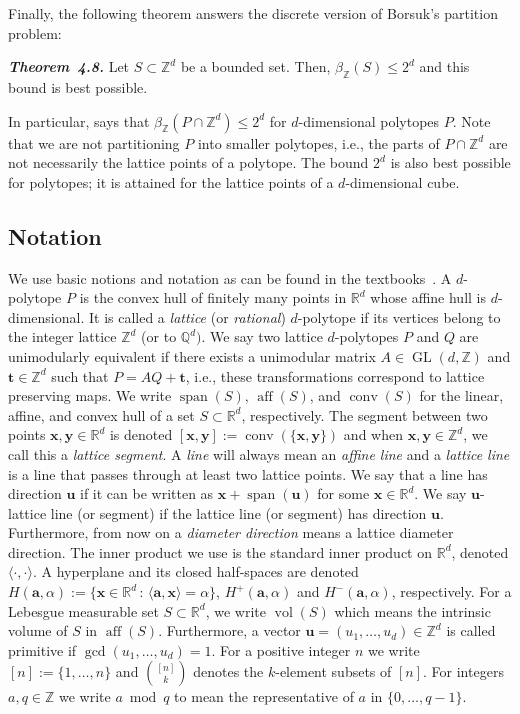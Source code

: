 \documentclass[11pt]{article}
\newcommand{\ba}{\mathbf{a}}
\newcommand{\bt}{\mathbf{t}}
\newcommand{\bu}{\mathbf{u}}
\newcommand{\bv}{\mathbf{v}}
\newcommand{\bx}{\mathbf{x}}
\newcommand{\by}{\mathbf{y}}
\newcommand{\R}{\mathbb{R}}
\newcommand{\Z}{\mathbb{Z}}
\newcommand{\Q}{\mathbb{Q}}
\DeclareMathOperator{\conv}{conv}
\DeclareMathOperator{\aff}{aff}
\DeclareMathOperator{\vol}{vol}
\DeclareMathOperator{\spn}{span}
\DeclareMathOperator{\GL}{GL} %
\newcommand{\st}{\, \mathrm{:}\,}
\begin{document}
Finally, the following theorem answers the discrete version of Borsuk's partition problem:

\begin{manualthm}\textbf{\emph{Theorem~4.8.}}
    Let $S \subset \Z^d$ be a bounded set. Then, $\beta_\Z(S) \leq 2^d$ and this bound is best possible.
\end{manualthm}

In particular,  says that $\beta_\Z(P \cap \Z^d) \leq 2^d$ for $d$-dimensional polytopes $P$. Note that we are not partitioning $P$ into smaller polytopes, i.e., the parts of $P \cap \Z^d$ are not necessarily the lattice points of a polytope. The bound $2^d$ is also best possible for polytopes; it is attained for the lattice points of a $d$-dimensional cube.

\subsection*{Notation}
We use basic notions and notation as can be found in the textbooks~\cite{grub07,zieglerbook}.
A $d$-polytope $P$ is the convex hull of finitely many points in $\R^d$ whose affine hull is $d$-dimensional. It is called a \emph{lattice} (or \emph{rational}) $d$-polytope if its vertices belong to the integer lattice $\Z^d$ (or to $\Q^d)$. We say two lattice $d$-polytopes $P$ and $Q$ are unimodularly equivalent if there exists a unimodular matrix $A \in \GL(d,\Z)$ and $\bt \in \Z^d$ such that $P=AQ+\bt$, i.e., these transformations correspond to lattice preserving maps. We write $\spn(S), \, \aff(S)$, and $\conv(S)$ for the linear, affine, and convex hull of a set $S \subset \R^d$, respectively.
The segment between two points $\bx,\by \in \R^d$ is denoted $[\bx,\by]:=\conv(\{\bx,\by\})$ and when $\bx,\by \in \Z^d$, we call this a \textit{lattice segment}. A \emph{line} will always mean an \emph{affine line} and a \emph{lattice line} is a line that passes through at least two lattice points. We say that a line has direction $\bu$ if it can be written as $\bx+\spn(\bu)$ for some $\bx \in \R^d$. We say $\bu$-lattice line (or segment) if the lattice line (or segment) has direction $\bu$. Furthermore, from now on a \textit{diameter direction} means a lattice diameter direction. The inner product we use is the standard inner product on $\R^d$, denoted $\langle \cdot, \cdot \rangle$. A hyperplane and its closed half-spaces are denoted $H(\ba,\alpha):= \{ \bx \in \R^d \st \langle \ba, \bx \rangle = \alpha \}$, $H^+(\ba,\alpha)$ and $H^{-}(\ba,\alpha)$, respectively. For a Lebesgue measurable set $S\subset \R^d$, we write $\vol(S)$ which means the intrinsic volume of $S$ in $\aff(S)$. Furthermore, a vector $\bu=(u_1, \ldots, u_d) \in \Z^d$ is called primitive if $\gcd(u_1, \ldots, u_d) =1$. For a positive integer $n$ we write $[n]:=\{1, \ldots, n\}$ and $\binom{[n]}{k}$ denotes the $k$-element subsets of $[n]$. For integers $a,q \in \Z$ we write $a \bmod q$ to mean the representative of $a$ in $\{0, \ldots, q-1\}$.
\end{document}
